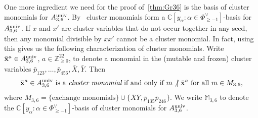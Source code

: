 \documentclass[10pt,a4paper]{amsart}
\newcommand{\thref}[1]{\ref{#1}}
\numberwithin{equation}{section}
\DeclareMathOperator{\univ}{univ}
\begin{document}
\medskip

One more ingredient we need for the proof of~\thref{thm:Gr36} is the basis of cluster monomials for $ A^{\rm univ}_{3,6}$.
By~\cite[Theorem~0.3 and p.~502]{GHKK} cluster monomials form a $\mathbb C[y_\alpha\colon \alpha\in \Phi^{\vee}_{\ge -1}]$-basis for $A_{3,6}^{\rm univ}$.
If $x$ and $x'$ are cluster variables that do not occur together in any seed, then any monomial divisible by $xx'$ cannot be a cluster monomial.
In fact, using~\cite[Theorem~7.12(b)]{Kel12} this gives us the following characterization of cluster monomials.
Write $\bar {\bf x}^{a}\in A_{3,6}^{\rm univ}$, $a\in \mathbb Z_{\ge 0}^{22}$, to denote a monomial in the (mutable and frozen) cluster variables $\bar p_{123},\dots, \bar p_{456},\bar X,\bar Y$. Then
\begin{gather}\label{eq:basis A36univ}
\bar {\bf x}^{a}\in A_{3,6}^{\univ} \text{ is a {\it cluster monomial} if and only if } m \not\vert \ \bar {\bf x}^a \text{ for all } m\in M_{3,6},
\end{gather}
where $M_{3,6}=\{\text{exchange monomials}\} \cup \big\{\bar X\bar Y,\bar p_{135}\bar p_{246}\big\}$. We write $\mathbb M_{3,6}$ to denote the $\mathbb C[y_\alpha\colon \alpha\in \Phi^{\vee}_{\ge -1}]$-basis of cluster monomials for $A_{3,6}^{\rm univ}$.
\end{document}
